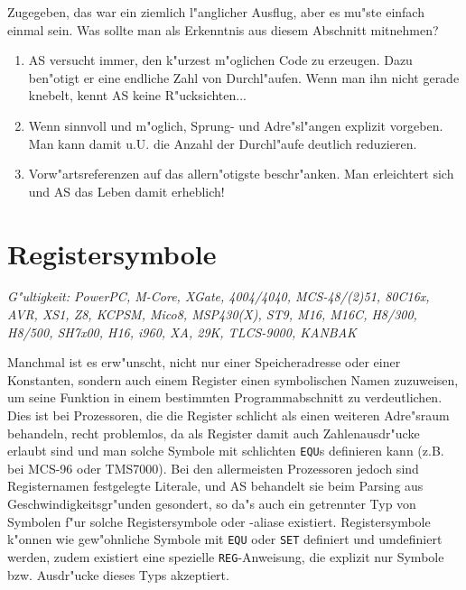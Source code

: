 \documentclass[12pt,a4paper,twoside]{report}
\makeatletter
\newcommand{\tty}[1]{{\tt #1}}
\newcommand{\ttindex}[1]{\index{#1@{\tt #1}}}
\makeatother
\begin{document}
Zugegeben, das war ein ziemlich l"anglicher Ausflug, aber es mu"ste einfach
einmal sein.  Was sollte man als Erkenntnis aus diesem Abschnitt mitnehmen?
\begin{enumerate}
\item{AS versucht immer, den k"urzest m"oglichen Code zu erzeugen.  Dazu
      ben"otigt er eine endliche Zahl von Durchl"aufen.  Wenn man ihn
      nicht gerade knebelt, kennt AS keine R"ucksichten...}
\item{Wenn sinnvoll und m"oglich, Sprung- und Adre"sl"angen explizit
      vorgeben.  Man kann damit u.U. die Anzahl der Durchl"aufe deutlich
      reduzieren.}
\item{Vorw"artsreferenzen auf das allern"otigste beschr"anken.  Man
      erleichtert sich und AS das Leben damit erheblich!}
\end{enumerate}


\section{Registersymbole}
\label{SectRegSyms} \ttindex{Registersymbole}

{\em G"ultigkeit: PowerPC, M-Core, XGate, 4004/4040, MCS-48/(2)51, 80C16x,
     AVR, XS1, Z8, KCPSM, Mico8, MSP430(X), ST9, M16, M16C, H8/300,
     H8/500, SH7x00, H16, i960, XA, 29K, TLCS-9000, KANBAK}

Manchmal ist es erw"unscht, nicht nur einer Speicheradresse oder einer
Konstanten, sondern auch einem Register einen symbolischen Namen zuzuweisen,
um seine Funktion in einem bestimmten Programmabschnitt zu verdeutlichen.
Dies ist bei Prozessoren, die die Register schlicht als einen weiteren
Adre"sraum behandeln, recht problemlos, da als Register damit auch
Zahlenausdr"ucke erlaubt sind und man solche Symbole mit schlichten
\tty{EQU}s definieren kann (z.B. bei MCS-96 oder TMS7000).  Bei den
allermeisten Prozessoren jedoch sind Registernamen festgelegte Literale, und
AS behandelt sie beim Parsing aus Geschwindigkeitsgr"unden gesondert, so da"s auch
ein getrennter Typ von Symbolen f"ur solche Registersymbole oder -aliase existiert.
Registersymbole k"onnen wie gew"ohnliche Symbole mit \tty{EQU} oder \tty{SET}
definiert und umdefiniert werden, zudem existiert eine spezielle \tty{REG}-Anweisung,
die explizit nur Symbole bzw. Ausdr"ucke dieses Typs akzeptiert.
\end{document}

